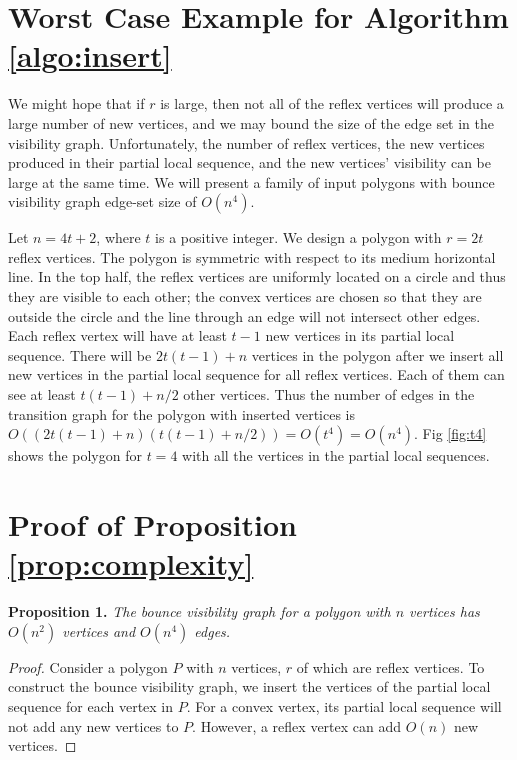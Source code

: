\documentclass[]{styles/svproc}  %
\begin{document}
\begin{appendix}

\section{Worst Case Example for Algorithm \ref{algo:insert}}

We might hope that if $r$ is large, then not all of the reflex vertices will
produce a large number of new vertices, and we may bound the size of the edge
set in the visibility graph. Unfortunately, the number of reflex
vertices, the new vertices produced in their partial local sequence, and the new
vertices' visibility can be large at the same time. We will present a family of
input polygons with bounce visibility graph edge-set size of $O(n^4)$.

Let $n = 4t+2$, where $t$ is a positive integer. We design a polygon with
$r = 2t$ reflex vertices. The polygon is symmetric with respect to its medium
horizontal line. In the top half, the reflex vertices are uniformly located on a
circle and thus they are visible to each other; the convex vertices are chosen
so that they are outside the circle and the line through an edge will not
intersect other edges. Each reflex vertex will have at least $t-1$ new
vertices in its partial local sequence. There will be $2t(t-1)+n$
vertices in the polygon after we insert all new vertices in the partial local
sequence for all reflex vertices. Each of them can see at least $t(t-1)+n/2$
other vertices. Thus the number of edges in the transition graph for the
polygon with inserted vertices is
$O ((2t(t-1)+n)(t(t-1)+n/2)) = O(t^4) = O(n^4)$.
Fig \ref{fig:t4} shows the polygon for $t = 4$ with all the
vertices in the partial local sequences. %

\section{Proof of Proposition \ref{prop:complexity}}


\textbf{Proposition 1.} {\em The bounce visibility graph for a polygon with $n$ vertices has 
$O(n^2)$ vertices and $O(n^4)$ edges.}

\begin{proof}

Consider a polygon $P$ with $n$ vertices, $r$ of which are reflex vertices. To
construct the bounce visibility graph, we insert the vertices of the partial
local sequence for each vertex in $P$. For a convex vertex, its partial local sequence 
will not add any new vertices to $P$. However, a reflex vertex can add $O(n)$ new vertices. 


\end{proof}
\end{appendix}
\end{document}
